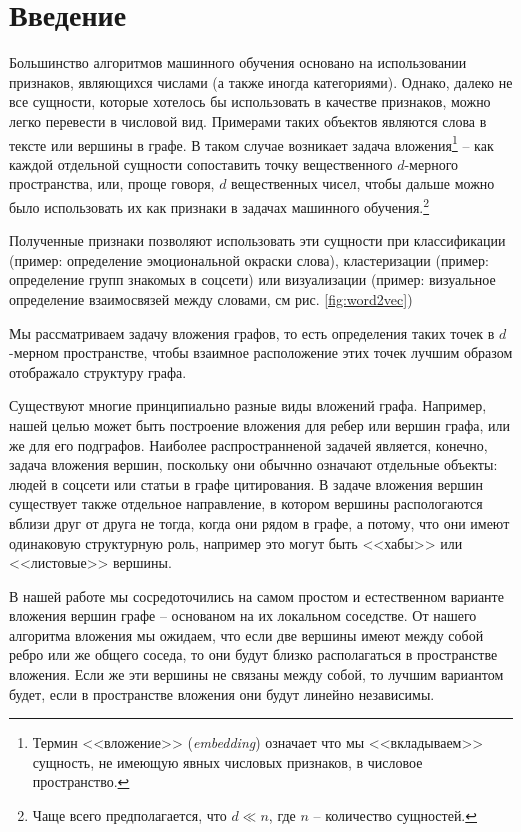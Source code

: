 \documentclass[12pt,a4paper]{extarticle}
\begin{document}
    \setcounter{page}{2}

    \tableofcontents

    \newpage

    \section{Введение}
    Большинство алгоритмов машинного обучения основано на использовании
    признаков, являющихся числами (а также иногда категориями).
    Однако, далеко не все сущности, которые хотелось бы использовать в качестве признаков,
    можно легко перевести в числовой вид.
    Примерами таких объектов являются слова в тексте или вершины в графе.
    В таком случае возникает задача вложения\footnote{Термин <<вложение>> (\textit{embedding}) означает что мы <<вкладываем>> сущность, не имеющую явных числовых признаков, в числовое пространство.} -- как каждой отдельной сущности сопоставить точку вещественного $d$-мерного пространства,
    или, проще говоря, $d$ вещественных чисел, чтобы дальше можно было использовать их как признаки в задачах машинного обучения.\footnote{Чаще всего предполагается, что $d \ll n$, где $n$ -- количество сущностей.}
    
    Полученные признаки позволяют использовать эти сущности при классификации (пример: определение эмоциональной окраски слова), кластеризации (пример: определение групп знакомых в соцсети) или визуализации (пример: визуальное определение взаимосвязей между словами, см рис. \ref{fig:word2vec})
    
    Мы рассматриваем задачу вложения графов, то есть определения таких точек в $d$-мерном пространстве, чтобы взаимное расположение этих точек лучшим образом отображало структуру графа.
    
    Существуют многие принципиально разные виды вложений графа.
    Например, нашей целью может быть построение вложения для ребер или вершин графа, или же для его подграфов.
    Наиболее распространненой задачей является, конечно, задача вложения вершин, поскольку они обычнно означают отдельные объекты: людей в соцсети или статьи в графе цитирования.
    В задаче вложения вершин существует также отдельное направление, в котором вершины распологаются вблизи друг от друга не тогда, когда они рядом в графе, а потому, что они имеют одинаковую структурную роль, например это могут быть <<хабы>> или <<листовые>> вершины.
    
    В нашей работе мы сосредоточились на самом простом и естественном варианте вложения вершин графе -- основаном на их локальном соседстве.
    От нашего алгоритма вложения мы ожидаем, что если две вершины имеют между собой ребро или же общего соседа, то они будут близко располагаться в пространстве вложения.
    Если же эти вершины не связаны между собой, то лучшим вариантом будет, если в пространстве вложения они будут линейно независимы.
    
\end{document}
